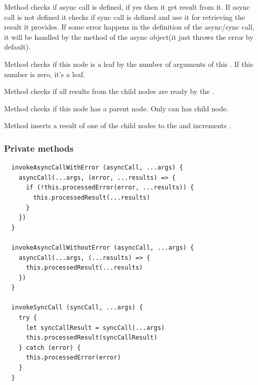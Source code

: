 \documentclass{article}
\begin{document}
Method  checks if async call is defined, if yes then it get result from it. If async call is not defined it checks if sync call is defined and use it for retrieving the result it provides. If some error happens in the definition of the async/sync call, it will be handled by the  method of the async object(it just throws the error by default).

Method  checks if this node is a leaf by the number of arguments of this . If this number is zero, it's a leaf.

Method  checks if all results from the child nodes are ready by the .

Method  checks if this node has a parent node. Only  can has child node.

Method  inserts a result of one of the child nodes to the  and increments .

\vspace*{10px}

\subsubsection{Private methods}

\begin{verbatim}
  invokeAsyncCallWithError (asyncCall, ...args) {
    asyncCall(...args, (error, ...results) => {
      if (!this.processedError(error, ...results)) {
        this.processedResult(...results)
      }
    })
  }

  invokeAsyncCallWithoutError (asyncCall, ...args) {
    asyncCall(...args, (...results) => {
      this.processedResult(...results)
    })
  }

  invokeSyncCall (syncCall, ...args) {
    try {
      let syncCallResult = syncCall(...args)
      this.processedResult(syncCallResult)
    } catch (error) {
      this.processedError(error)
    }
  }
\end{verbatim}

\newpage
\end{document}
